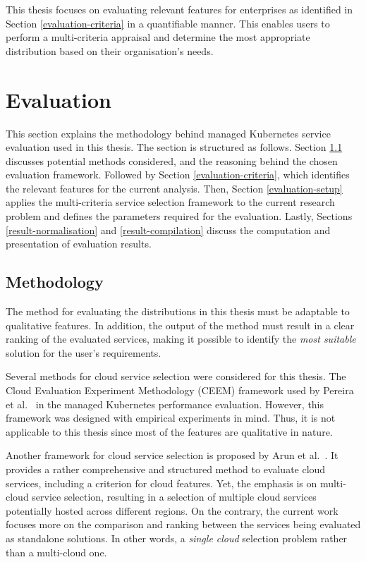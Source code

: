 This thesis focuses on evaluating relevant features for enterprises as identified in Section \ref{evaluation-criteria} in a quantifiable manner. This enables users to perform a multi-criteria appraisal and determine the most appropriate distribution based on their organisation's needs.


\chapter{Evaluation}\label{evaluation-methodology}

This section explains the methodology behind managed Kubernetes service evaluation used in this thesis. The section is structured as follows. Section \ref{sec:multi-criteria-service-selection} discusses potential methods considered, and the reasoning behind the chosen evaluation framework. Followed by Section \ref{evaluation-criteria}, which identifies the relevant features for the current analysis. Then, Section \ref{evaluation-setup} applies the multi-criteria service selection framework to the current research problem and defines the parameters required for the evaluation. Lastly, Sections \ref{result-normalisation} and \ref{result-compilation} discuss the computation and presentation of evaluation results.

\section{Methodology}\label{sec:multi-criteria-service-selection}

The method for evaluating the distributions in this thesis must be
adaptable to qualitative features. In addition, the output of the method
must result in a clear ranking of the evaluated services, making it possible to identify the \textit{most suitable} solution for the user's requirements.

Several methods for cloud service selection were considered for this thesis. The Cloud
Evaluation Experiment Methodology (CEEM) framework used by Pereira
et al.~\cite{pereiraferreiraPerformanceEvaluationContainers2019} in the
managed Kubernetes performance evaluation. However, this framework was designed with empirical experiments
in mind. Thus, it is not applicable to this thesis since most of the
features are qualitative in nature.

Another framework for cloud service selection is proposed by Arun et
al.~\cite{9284492}. It provides a rather comprehensive and structured
method to evaluate cloud services, including a criterion for cloud
features. Yet, the emphasis is on multi-cloud service selection, resulting in a selection of multiple cloud services potentially hosted across different regions. On the contrary, the
current work focuses more on the comparison and ranking between the
services being evaluated as standalone solutions. In other words, a \textit{single cloud} selection problem rather than a multi-cloud one.

